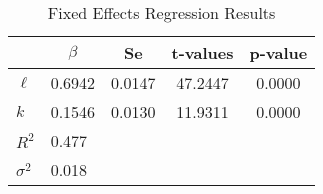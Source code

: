 \begin{table}[H] 
\centering
\caption{Fixed Effects Regression Results}
\begin{tabular}{lcccc}
\toprule
 & $\beta$  & Se & t-values & p-value \\
\midrule
$\ell $  & 0.6942 & 0.0147 & 47.2447 & 0.0000 \\
$k$ & 0.1546 & 0.0130 & 11.9311 & 0.0000 \\
\midrule
$R^2$ & \multicolumn{4}{l}{0.477} \\
$\sigma^2$ & \multicolumn{4}{l}{0.018} \\
\bottomrule
\end{tabular}
\label{tab:results}
\end{table}
